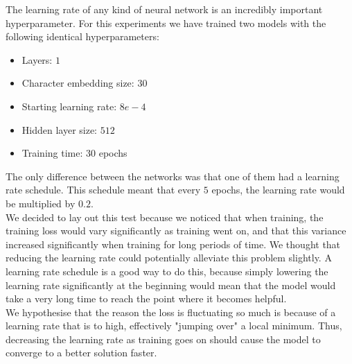 The learning rate of any kind of neural network is an incredibly important hyperparameter. For this experiments we have trained two models with the following identical hyperparameters:
\begin{itemize}
	\item Layers: $1$
	\item Character embedding size: 30
	\item Starting learning rate: $8e-4$
	\item Hidden layer size: $512$
	\item Training time: 30 epochs
\end{itemize}
The only difference between the networks was that one of them had a learning rate schedule. This schedule meant that every $5$ epochs, the learning rate would be multiplied by $0.2$. \\

\noindent
We decided to lay out this test because we noticed that when training, the training loss would vary significantly as training went on, and that this variance increased significantly when training for long periods of time. We thought that reducing the learning rate could potentially alleviate this problem slightly. A learning rate schedule is a good way to do this, because simply lowering the learning rate significantly at the beginning would mean that the model would take a very long time to reach the point where it becomes helpful.\\

\noindent
We hypothesise that the reason the loss is fluctuating so much is because of a learning rate that is to high, effectively "jumping over" a local minimum. Thus, decreasing the learning rate as training goes on should cause the model to converge to a better solution faster.